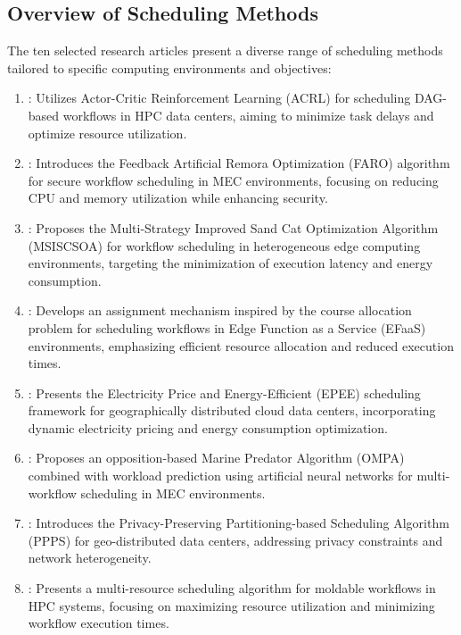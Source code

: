 \documentclass[a4paper, final]{article}
\begin{document}
\subsection{Overview of Scheduling Methods}
The ten selected research articles present a diverse range of scheduling methods tailored to specific computing 
environments and objectives:
\begin{enumerate}
\item \cite{bib:1_acrl}: Utilizes Actor-Critic Reinforcement Learning (ACRL) for scheduling DAG-based
workflows in HPC data centers, aiming to minimize task delays and optimize resource utilization.

\item \cite{bib:2_faro}: Introduces the Feedback Artificial Remora Optimization (FARO) algorithm for 
secure workflow scheduling in MEC environments, focusing on reducing CPU and memory utilization while 
enhancing security.

\item \cite{bib:3_sandcat}: Proposes the Multi-Strategy Improved Sand Cat Optimization Algorithm 
(MSISCSOA) for workflow scheduling in heterogeneous edge computing environments, targeting the 
minimization of execution latency and energy consumption.

\item \cite{bib:4_faas}: Develops an assignment mechanism inspired by the course allocation problem 
for scheduling workflows in Edge Function as a Service (EFaaS) environments, emphasizing efficient 
resource allocation and reduced execution times.

\item \cite{bib:5_epee}: Presents the Electricity Price and Energy-Efficient (EPEE) scheduling framework 
for geographically distributed cloud data centers, incorporating dynamic electricity pricing and energy 
consumption optimization.

\item \cite{bib:6_marine}: Proposes an opposition-based Marine Predator Algorithm (OMPA) combined with 
workload prediction using artificial neural networks for multi-workflow scheduling in MEC environments.

\item \cite{bib:7_ppps}: Introduces the Privacy-Preserving Partitioning-based Scheduling Algorithm 
(PPPS) for geo-distributed data centers, addressing privacy constraints and network heterogeneity.

\item \cite{bib:8}: Presents a multi-resource scheduling algorithm for moldable workflows in HPC 
systems, focusing on maximizing resource utilization and minimizing workflow execution times.


\end{enumerate}
\end{document}
